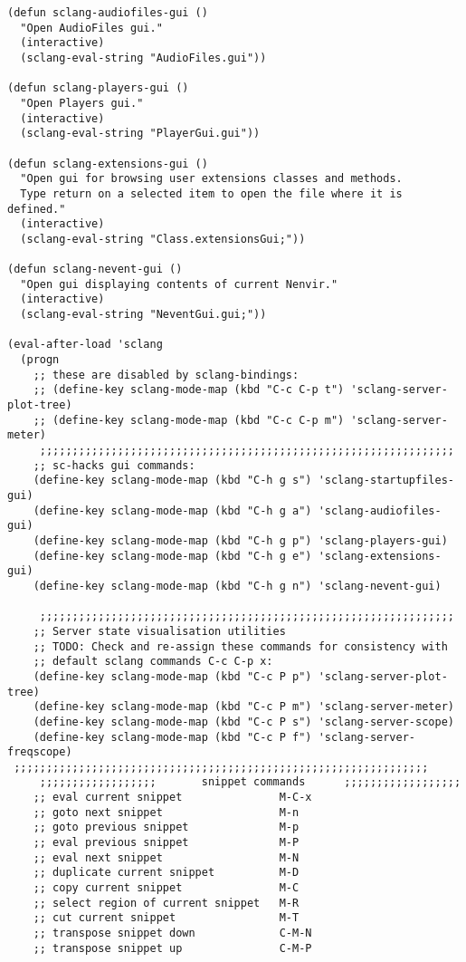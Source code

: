 \documentclass[11pt]{article}
\begin{document}
\begin{verbatim}
(defun sclang-audiofiles-gui ()
  "Open AudioFiles gui."
  (interactive)
  (sclang-eval-string "AudioFiles.gui"))

(defun sclang-players-gui ()
  "Open Players gui."
  (interactive)
  (sclang-eval-string "PlayerGui.gui"))

(defun sclang-extensions-gui ()
  "Open gui for browsing user extensions classes and methods.
  Type return on a selected item to open the file where it is defined."
  (interactive)
  (sclang-eval-string "Class.extensionsGui;"))

(defun sclang-nevent-gui ()
  "Open gui displaying contents of current Nenvir."
  (interactive)
  (sclang-eval-string "NeventGui.gui;"))

(eval-after-load 'sclang
  (progn
    ;; these are disabled by sclang-bindings:
    ;; (define-key sclang-mode-map (kbd "C-c C-p t") 'sclang-server-plot-tree)
    ;; (define-key sclang-mode-map (kbd "C-c C-p m") 'sclang-server-meter)
     ;;;;;;;;;;;;;;;;;;;;;;;;;;;;;;;;;;;;;;;;;;;;;;;;;;;;;;;;;;;;;;;;
    ;; sc-hacks gui commands:
    (define-key sclang-mode-map (kbd "C-h g s") 'sclang-startupfiles-gui)
    (define-key sclang-mode-map (kbd "C-h g a") 'sclang-audiofiles-gui)
    (define-key sclang-mode-map (kbd "C-h g p") 'sclang-players-gui)
    (define-key sclang-mode-map (kbd "C-h g e") 'sclang-extensions-gui)
    (define-key sclang-mode-map (kbd "C-h g n") 'sclang-nevent-gui)

     ;;;;;;;;;;;;;;;;;;;;;;;;;;;;;;;;;;;;;;;;;;;;;;;;;;;;;;;;;;;;;;;;
    ;; Server state visualisation utilities
    ;; TODO: Check and re-assign these commands for consistency with
    ;; default sclang commands C-c C-p x:
    (define-key sclang-mode-map (kbd "C-c P p") 'sclang-server-plot-tree)
    (define-key sclang-mode-map (kbd "C-c P m") 'sclang-server-meter)
    (define-key sclang-mode-map (kbd "C-c P s") 'sclang-server-scope)
    (define-key sclang-mode-map (kbd "C-c P f") 'sclang-server-freqscope)
 ;;;;;;;;;;;;;;;;;;;;;;;;;;;;;;;;;;;;;;;;;;;;;;;;;;;;;;;;;;;;;;;;
     ;;;;;;;;;;;;;;;;;;       snippet commands      ;;;;;;;;;;;;;;;;;;
    ;; eval current snippet               M-C-x
    ;; goto next snippet                  M-n
    ;; goto previous snippet              M-p
    ;; eval previous snippet              M-P
    ;; eval next snippet                  M-N
    ;; duplicate current snippet          M-D
    ;; copy current snippet               M-C
    ;; select region of current snippet   M-R
    ;; cut current snippet                M-T
    ;; transpose snippet down             C-M-N
    ;; transpose snippet up               C-M-P


\end{verbatim}
\end{document}
